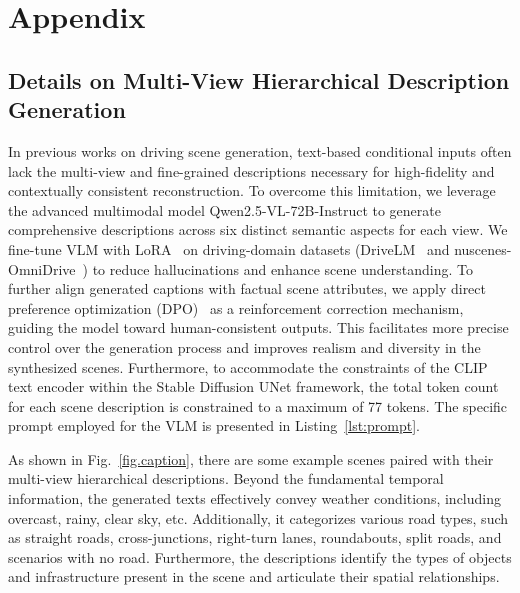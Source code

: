\clearpage
\setcounter{page}{1}
\maketitlesupplementary


\section{Appendix}
\subsection{Details on Multi-View Hierarchical Description Generation}
In previous works on driving scene generation, text-based conditional inputs often lack the multi-view and fine-grained descriptions necessary for high-fidelity and contextually consistent reconstruction. 
To overcome this limitation, we leverage the advanced multimodal model Qwen2.5-VL-72B-Instruct to generate comprehensive descriptions across six distinct semantic aspects for each view. 
We fine-tune VLM with LoRA~\cite{hu2022lora} on driving-domain datasets (DriveLM~\cite{sima2024drivelm} and nuscenes-OmniDrive~\cite{wang2025omnidrive}) to reduce hallucinations and enhance scene understanding.
To further align generated captions with factual scene attributes, we apply direct preference optimization (DPO)~\cite{rafailov2023direct} as a reinforcement correction mechanism, guiding the model toward human-consistent outputs.
This facilitates more precise control over the generation process and improves realism and diversity in the synthesized scenes.
Furthermore, to accommodate the constraints of the CLIP text encoder within the Stable Diffusion UNet framework, the total token count for each scene description is constrained to a maximum of 77 tokens. 
The specific prompt employed for the VLM is presented in Listing~\ref{lst:prompt}.

As shown in Fig.~\ref{fig.caption}, there are some example scenes paired with their multi-view hierarchical descriptions.
Beyond the fundamental temporal information, the generated texts effectively convey weather conditions, including overcast, rainy, clear sky, etc. 
Additionally, it categorizes various road types, such as straight roads, cross-junctions, right-turn lanes, roundabouts, split roads, and scenarios with no road. 
Furthermore, the descriptions identify the types of objects and infrastructure present in the scene and articulate their spatial relationships.

